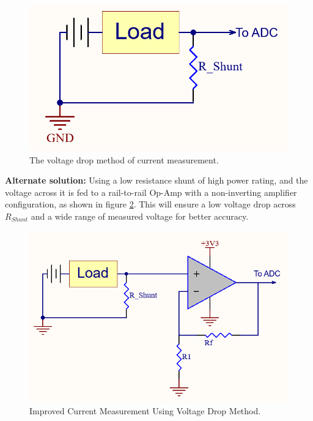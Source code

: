\begin{figure}[h!]
	\centering
	\includegraphics[scale=0.4]{./Figures/HW/Current-Measurement.png}
	\caption{The voltage drop method of current measurement.}
	\label{fig:hw-current-mes}
\end{figure}


\textbf{Alternate solution:} Using a low resistance shunt of high power rating, and the voltage across it is fed to a rail-to-rail Op-Amp with a non-inverting amplifier configuration, as shown in figure \ref{fig:hw-current-mes-2}. This will ensure a low voltage drop across \textbf{$R_{Shunt}$} and a wide range of measured voltage for better accuracy. 

\begin{figure}[h!]
    \centering
    \includegraphics[scale=0.5]{./Figures/HW/Improved-Current-Measurement.png}
    \caption{Improved Current Measurement Using Voltage Drop Method.}
    \label{fig:hw-current-mes-2}
\end{figure}

